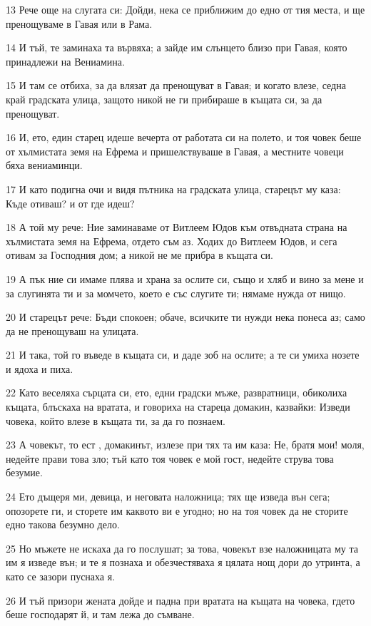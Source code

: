 \par 13 Рече още на слугата си: Дойди, нека се приближим до едно от тия места, и ще пренощуваме в Гавая или в Рама.
\par 14 И тъй, те заминаха та вървяха; а зайде им слънцето близо при Гавая, която принадлежи на Вениамина.
\par 15 И там се отбиха, за да влязат да пренощуват в Гавая; и когато влезе, седна край градската улица, защото никой не ги прибираше в къщата си, за да пренощуват.
\par 16 И, ето, един старец идеше вечерта от работата си на полето, и тоя човек беше от хълмистата земя на Ефрема и пришелствуваше в Гавая, а местните човеци бяха вениаминци.
\par 17 И като подигна очи и видя пътника на градската улица, старецът му каза: Къде отиваш? и от где идеш?
\par 18 А той му рече: Ние заминаваме от Витлеем Юдов към отвъдната страна на хълмистата земя на Ефрема, отдето съм аз. Ходих до Витлеем Юдов, и сега отивам за Господния дом; а никой не ме прибра в къщата си.
\par 19 А пък ние си имаме плява и храна за ослите си, също и хляб и вино за мене и за слугинята ти и за момчето, което е със слугите ти; нямаме нужда от нищо.
\par 20 И старецът рече: Бъди спокоен; обаче, всичките ти нужди нека понеса аз; само да не пренощуваш на улицата.
\par 21 И така, той го въведе в къщата си, и даде зоб на ослите; а те си умиха нозете и ядоха и пиха.
\par 22 Като веселяха сърцата си, ето, едни градски мъже, развратници, обиколиха къщата, блъскаха на вратата, и говориха на стареца домакин, казвайки: Изведи човека, който влезе в къщата ти, за да го познаем.
\par 23 А човекът, то ест , домакинът, излезе при тях та им каза: Не, братя мои! моля, недейте прави това зло; тъй като тоя човек е мой гост, недейте струва това безумие.
\par 24 Ето дъщеря ми, девица, и неговата наложница; тях ще изведа вън сега; опозорете ги, и сторете им каквото ви е угодно; но на тоя човек да не сторите едно такова безумно дело.
\par 25 Но мъжете не искаха да го послушат; за това, човекът взе наложницата му та им я изведе вън; и те я познаха и обезчестяваха я цялата нощ дори до утринта, а като се зазори пуснаха я.
\par 26 И тъй призори жената дойде и падна при вратата на къщата на човека, гдето беше господарят й, и там лежа до съмване.
